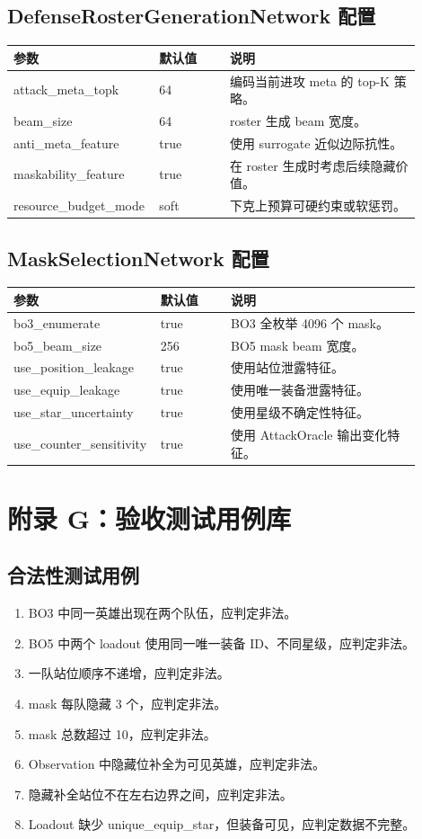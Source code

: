\documentclass[UTF8,12pt,openany]{ctexbook}
\begin{document}
\section{DefenseRosterGenerationNetwork 配置}
\begin{longtable}{p{0.27\linewidth}p{0.17\linewidth}p{0.46\linewidth}}
\toprule
参数 & 默认值 & 说明 \\
\midrule
attack\_meta\_topk & 64 & 编码当前进攻 meta 的 top-K 策略。\\
beam\_size & 64 & roster 生成 beam 宽度。\\
anti\_meta\_feature & true & 使用 surrogate 近似边际抗性。\\
maskability\_feature & true & 在 roster 生成时考虑后续隐藏价值。\\
resource\_budget\_mode & soft & 下克上预算可硬约束或软惩罚。\\
\bottomrule
\end{longtable}

\section{MaskSelectionNetwork 配置}
\begin{longtable}{p{0.27\linewidth}p{0.17\linewidth}p{0.46\linewidth}}
\toprule
参数 & 默认值 & 说明 \\
\midrule
bo3\_enumerate & true & BO3 全枚举 4096 个 mask。\\
bo5\_beam\_size & 256 & BO5 mask beam 宽度。\\
use\_position\_leakage & true & 使用站位泄露特征。\\
use\_equip\_leakage & true & 使用唯一装备泄露特征。\\
use\_star\_uncertainty & true & 使用星级不确定性特征。\\
use\_counter\_sensitivity & true & 使用 AttackOracle 输出变化特征。\\
\bottomrule
\end{longtable}

\chapter{附录 G：验收测试用例库}
\section{合法性测试用例}
\begin{enumerate}[leftmargin=2em]
\item BO3 中同一英雄出现在两个队伍，应判定非法。
\item BO5 中两个 loadout 使用同一唯一装备 ID、不同星级，应判定非法。
\item 一队站位顺序不递增，应判定非法。
\item mask 每队隐藏 3 个，应判定非法。
\item mask 总数超过 10，应判定非法。
\item Observation 中隐藏位补全为可见英雄，应判定非法。
\item 隐藏补全站位不在左右边界之间，应判定非法。
\item Loadout 缺少 unique\_equip\_star，但装备可见，应判定数据不完整。
\end{enumerate}
\end{document}
